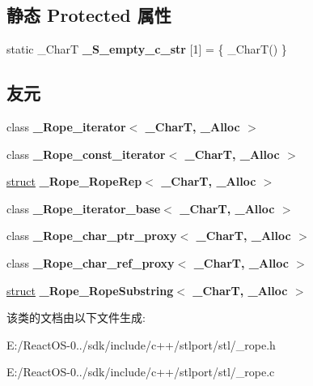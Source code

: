 \subsection*{静态 Protected 属性}
\begin{DoxyCompactItemize}
\item 
\mbox{\label{classrope_ac0570fa4128d2f8369874b9c7709124b}} 
static \+\_\+\+CharT {\bfseries \+\_\+\+S\+\_\+empty\+\_\+c\+\_\+str} \mbox{[}1\mbox{]} = \{ \+\_\+\+CharT() \}
\end{DoxyCompactItemize}
\subsection*{友元}
\begin{DoxyCompactItemize}
\item 
\mbox{\label{classrope_a5825d72aa563565af5d7520068cccda0}} 
class {\bfseries \+\_\+\+Rope\+\_\+iterator$<$ \+\_\+\+Char\+T, \+\_\+\+Alloc $>$}
\item 
\mbox{\label{classrope_a1f420538a50c0bb0627c069d1031a34c}} 
class {\bfseries \+\_\+\+Rope\+\_\+const\+\_\+iterator$<$ \+\_\+\+Char\+T, \+\_\+\+Alloc $>$}
\item 
\mbox{\label{classrope_afa300df0b104fac11b2043003b93a5f7}} 
\hyperlink{interfacestruct}{struct} {\bfseries \+\_\+\+Rope\+\_\+\+Rope\+Rep$<$ \+\_\+\+Char\+T, \+\_\+\+Alloc $>$}
\item 
\mbox{\label{classrope_ac2723b2b8cea10d38d4633d137f8fe14}} 
class {\bfseries \+\_\+\+Rope\+\_\+iterator\+\_\+base$<$ \+\_\+\+Char\+T, \+\_\+\+Alloc $>$}
\item 
\mbox{\label{classrope_ae1cd406d49c74f72ff2f3867d07dc465}} 
class {\bfseries \+\_\+\+Rope\+\_\+char\+\_\+ptr\+\_\+proxy$<$ \+\_\+\+Char\+T, \+\_\+\+Alloc $>$}
\item 
\mbox{\label{classrope_aa766e2447cd90065171dff449cea0994}} 
class {\bfseries \+\_\+\+Rope\+\_\+char\+\_\+ref\+\_\+proxy$<$ \+\_\+\+Char\+T, \+\_\+\+Alloc $>$}
\item 
\mbox{\label{classrope_ade3055718ef9d1a10124cca4c9e60553}} 
\hyperlink{interfacestruct}{struct} {\bfseries \+\_\+\+Rope\+\_\+\+Rope\+Substring$<$ \+\_\+\+Char\+T, \+\_\+\+Alloc $>$}
\end{DoxyCompactItemize}


该类的文档由以下文件生成\+:\begin{DoxyCompactItemize}
\item 
E\+:/\+React\+O\+S-\/0../sdk/include/c++/stlport/stl/\+\_\+rope.\+h\item 
E\+:/\+React\+O\+S-\/0../sdk/include/c++/stlport/stl/\+\_\+rope.\+c\end{DoxyCompactItemize}

